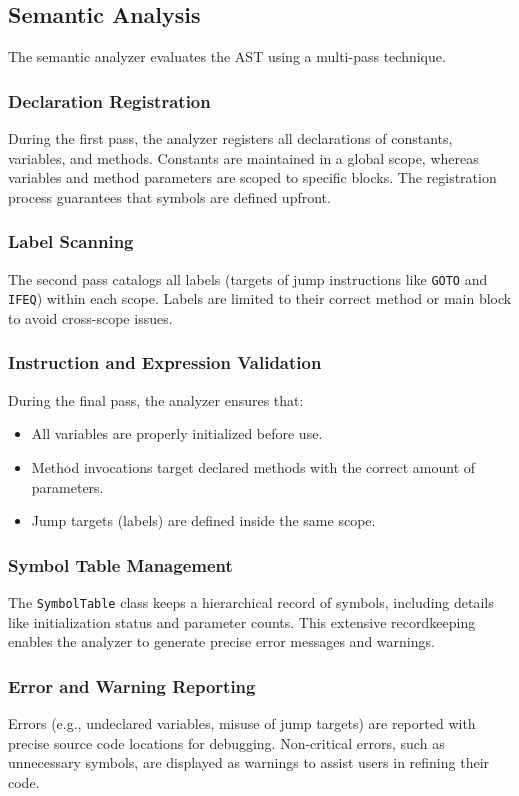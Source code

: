 \documentclass[11pt]{article}
\begin{document}
\subsection{Semantic Analysis}
 The semantic analyzer evaluates the AST using a multi-pass technique.

 \subsubsection{Declaration Registration}
 During the first pass, the analyzer registers all declarations of constants, variables, and methods.  Constants are maintained in a global scope, whereas variables and method parameters are scoped to specific blocks.  The registration process guarantees that symbols are defined upfront.

 \subsubsection{Label Scanning}
 The second pass catalogs all labels (targets of jump instructions like \texttt{GOTO} and \texttt{IFEQ}) within each scope.  Labels are limited to their correct method or main block to avoid cross-scope issues.

\subsubsection{Instruction and Expression Validation}
During the final pass, the analyzer ensures that: 
\begin{itemize} 
	\item All variables are properly initialized before use. 
	\item Method invocations target declared methods with the correct amount of parameters. 
	\item Jump targets (labels) are defined inside the same scope.
\end{itemize}

\subsubsection{Symbol Table Management}
The \texttt{SymbolTable} class keeps a hierarchical record of symbols, including details like initialization status and parameter counts. This extensive recordkeeping enables the analyzer to generate precise error messages and warnings.

\subsubsection{Error and Warning Reporting} 
Errors (e.g., undeclared variables, misuse of jump targets) are reported with precise source code locations for debugging. Non-critical errors, such as unnecessary symbols, are displayed as warnings to assist users in refining their code.
\end{document}
